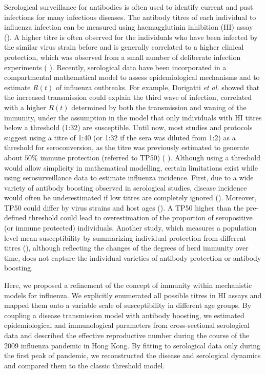 \documentclass{article}
\begin{document}
Serological surveillance for antibodies is often used to identify current and past infections for many infectious diseases. The antibody titres of each individual to influenza infection can be measured using haemagglutinin inhibition (HI) assay (\cite{Hirst1941}). A higher titre is often observed for the individuals who have been infected by the similar virus strain before and is generally correlated to a higher clinical protection, which was observed from a small number of deliberate infection experiments (\cite{Hobson1972} \cite{Dunning2006} \cite{Coudeville2010}). Recently, serological data have been incorporated in a compartmental mathematical model to assess epidemiological mechanisms and to estimate $R(t)$ of influenza outbreaks. For example, Dorigatti \textit{et al.} showed that the increased transmission could explain the third wave of infection, correlated with a higher $R(t)$ determined by both the transmission and waning of the immunity, under the assumption in the model that only individuals with HI titres below a threshold (1:32) are susceptible. Until now, most studies and protocols suggest using a titre of 1:40 (or 1:32 if the sera was diluted from 1:2) as a threshold for seroconversion, as the titre was previously estimated to generate about $50\%$ immune protection (referred to TP50) (\cite{Hobson1972} \cite{Coudeville2010}). Although using a threshold would allow simplicity in mathematical modelling, certain limitations exist while using serosurveillance data to estimate influenza incidence. First, due to a wide variety of antibody boosting observed in serological studies, disease incidence would often be underestimated if low titres are completely ignored (\cite{Wu2014a}). Moreover, TP50 could differ by virus strains and host ages  (\cite{Black2012}). A TP50 higher than the pre-defined threshold could lead to overestimation of the proportion of seropositive (or immune protected) individuals. Another study, which measures a population level mean susceptibility by summarizing individual protection from different titres (\cite{Baguelin2013}), although reflecting the changes of the degrees of herd immunity over time, does not capture the individual varieties of antibody protection or antibody boosting.

Here, we proposed a refinement of the concept of immunity within mechanistic models for influenza. We explicitly enumerated all possible titres in HI assays and mapped them onto a variable scale of susceptibility in different age groups. By coupling a disease transmission model with antibody boosting, we estimated epidemiological and immunological parameters from cross-sectional serological data and described the effective reproductive number during the course of the 2009 influenza pandemic in Hong Kong. By fitting to serological data only during the first peak of pandemic, we reconstructed the disease and serological dynamics and compared them to the classic threshold model.  
\end{document}
